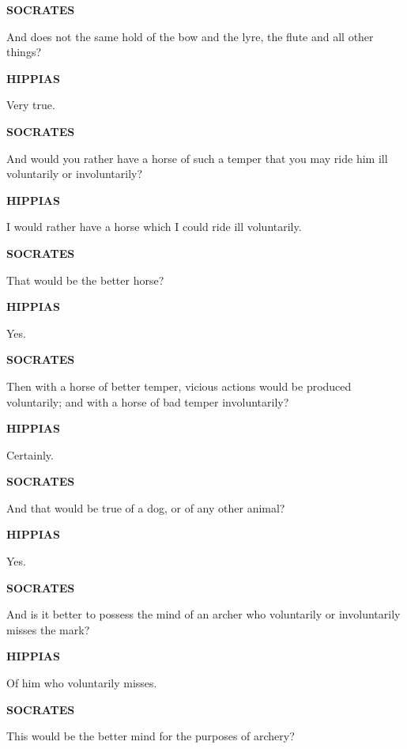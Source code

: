 \documentclass[11pt,letter]{article}
\begin{document}
\par \textbf{SOCRATES}
\par   And does not the same hold of the bow and the lyre, the flute and all other things?

\par \textbf{HIPPIAS}
\par   Very true.

\par \textbf{SOCRATES}
\par   And would you rather have a horse of such a temper that you may ride him ill voluntarily or involuntarily?

\par \textbf{HIPPIAS}
\par   I would rather have a horse which I could ride ill voluntarily.

\par \textbf{SOCRATES}
\par   That would be the better horse?

\par \textbf{HIPPIAS}
\par   Yes.

\par \textbf{SOCRATES}
\par   Then with a horse of better temper, vicious actions would be produced voluntarily; and with a horse of bad temper involuntarily?

\par \textbf{HIPPIAS}
\par   Certainly.

\par \textbf{SOCRATES}
\par   And that would be true of a dog, or of any other animal?

\par \textbf{HIPPIAS}
\par   Yes.

\par \textbf{SOCRATES}
\par   And is it better to possess the mind of an archer who voluntarily or involuntarily misses the mark?

\par \textbf{HIPPIAS}
\par   Of him who voluntarily misses.

\par \textbf{SOCRATES}
\par   This would be the better mind for the purposes of archery?
\end{document}
